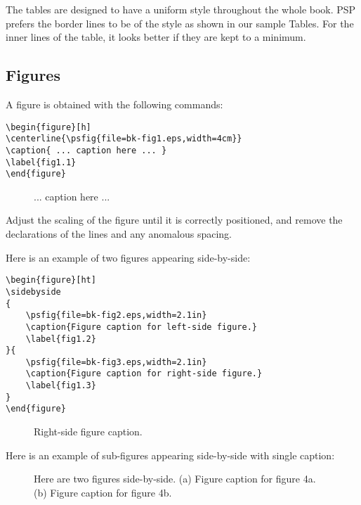 The tables are designed to have a uniform style throughout the whole
book. PSP prefers the border lines to be of the style as shown in
our sample Tables. For the inner lines of the table, it looks better
if they are kept to a minimum.

\subsection{Figures}
A figure is obtained with the following commands:
\begin{verbatim}
\begin{figure}[h]
\centerline{\psfig{file=bk-fig1.eps,width=4cm}}
\caption{ ... caption here ... }
\label{fig1.1}
\end{figure}
\end{verbatim}
\begin{figure}[h]
\centerline{}
\caption{ ... caption here ... }
\label{fig1.1}
\end{figure}

Adjust the scaling of the figure until it is correctly
positioned, and remove the declarations of the lines and any
anomalous spacing.

Here is an example of two figures appearing side-by-side:
\begin{verbatim}
\begin{figure}[ht]
\sidebyside
{
    \psfig{file=bk-fig2.eps,width=2.1in}
    \caption{Figure caption for left-side figure.}
    \label{fig1.2}
}{
    \psfig{file=bk-fig3.eps,width=2.1in}
    \caption{Figure caption for right-side figure.}
    \label{fig1.3}
}
\end{figure}
\end{verbatim}

\begin{figure}[ht]
\sidebyside
{
    \caption{Left-side figure caption.}\label{fig1.2}
}{
    \caption{Right-side figure caption.}\label{fig1.3}
}
\end{figure}

Here is an example of sub-figures appearing side-by-side with single caption:

\begin{figure}
\begin{center}
\enskip
{}
  \caption{Here are two figures side-by-side. (a) Figure caption for figure 4a. (b) Figure caption for figure 4b.}%
  \label{fig1.4}%
\end{center}
\end{figure}

